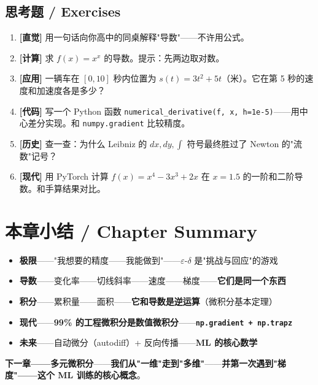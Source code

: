 \subsection{思考题 / Exercises}

\begin{enumerate}
\item \textbf{[直觉]} 用一句话向你高中的同桌解释"导数"——不许用公式。
\item \textbf{[计算]} 求 $f(x) = x^x$ 的导数。提示：先两边取对数。
\item \textbf{[应用]} 一辆车在 $[0, 10]$ 秒内位置为 $s(t) = 3t^2 + 5t$（米）。它在第 5 秒的速度和加速度各是多少？
\item \textbf{[代码]} 写一个 Python 函数 \texttt{numerical\_derivative(f, x, h=1e-5)}——用中心差分实现。和 \texttt{numpy.gradient} 比较精度。
\item \textbf{[历史]} 查一查：为什么 Leibniz 的 $dx, dy, \int$ 符号最终胜过了 Newton 的"流数"记号？
\item \textbf{[现代]} 用 PyTorch 计算 $f(x) = x^4 - 3x^3 + 2x$ 在 $x=1.5$ 的一阶和二阶导数。和手算结果对比。
\end{enumerate}

\section{本章小结 / Chapter Summary}

\begin{tcolorbox}[essbox={本章核心}]
\begin{itemize}
\item \textbf{极限}——"我想要的精度——我能做到"——$\varepsilon\text{-}\delta$ 是"挑战与回应"的游戏
\item \textbf{导数}——变化率——切线斜率——速度——梯度——\textbf{它们是同一个东西}
\item \textbf{积分}——累积量——面积——\textbf{它和导数是逆运算}（微积分基本定理）
\item \textbf{现代}——\textbf{99\% 的工程微积分是数值微积分}——\textbf{\texttt{np.gradient + np.trapz}}
\item \textbf{未来}——自动微分（autodiff）+ 反向传播——\textbf{ML 的核心数学}
\end{itemize}
\end{tcolorbox}

\textbf{下一章——多元微积分}——\textbf{我们从"一维"走到"多维"}——\textbf{并第一次遇到"梯度"——这个 ML 训练的核心概念}。

\clearpage
